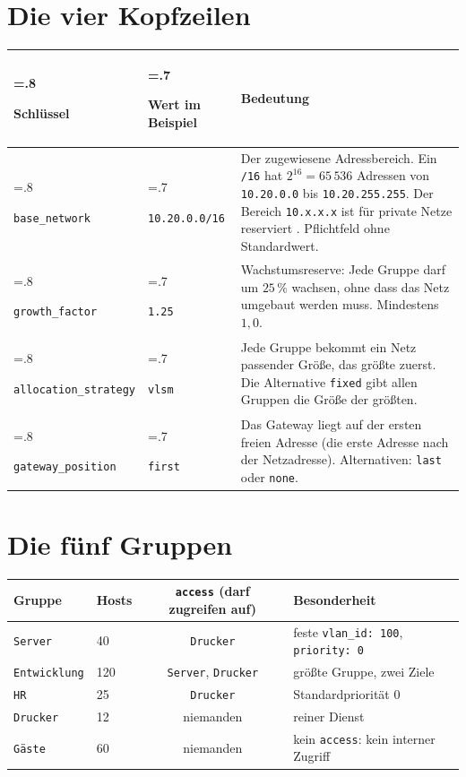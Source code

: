 \documentclass[a4paper,12pt, twoside]{report}
\theoremstyle{definition}
\begin{document}
\section{Die vier Kopfzeilen}

\begin{center}
\small
\begin{tabularx}{\textwidth}{>{\hsize=.8\hsize\raggedright\arraybackslash}X>{\hsize=.7\hsize\raggedright\arraybackslash}X>{\hsize=1.5\hsize\raggedright\arraybackslash}X}
\toprule
Schlüssel & Wert im Beispiel & Bedeutung \\
\midrule
\texttt{base\_network} & \texttt{10.20.0.0/16} & Der zugewiesene Adressbereich. Ein \texttt{/16} hat $2^{16} = 65\,536$ Adressen von \texttt{10.20.0.0} bis \texttt{10.20.255.255}. Der Bereich \texttt{10.x.x.x} ist für private Netze reserviert \cite{rfc1918}. Pflichtfeld ohne Standardwert. \\
\texttt{growth\_factor} & \texttt{1.25} & Wachstumsreserve: Jede Gruppe darf um $25\,\%$ wachsen, ohne dass das Netz umgebaut werden muss. Mindestens $1{,}0$. \\
\texttt{allocation\_strategy} & \texttt{vlsm} & Jede Gruppe bekommt ein Netz passender Größe, das größte zuerst. Die Alternative \texttt{fixed} gibt allen Gruppen die Größe der größten. \\
\texttt{gateway\_position} & \texttt{first} & Das Gateway liegt auf der ersten freien Adresse (die erste Adresse nach der Netzadresse). Alternativen: \texttt{last} oder \texttt{none}. \\
\bottomrule
\end{tabularx}
\end{center}

\section{Die fünf Gruppen}

\begin{center}
\small
\begin{tabular}{llcl}
\toprule
Gruppe & Hosts & \texttt{access} (darf zugreifen auf) & Besonderheit \\
\midrule
\texttt{Server} & 40 & \texttt{Drucker} & feste \texttt{vlan\_id: 100}, \texttt{priority: 0} \\
\texttt{Entwicklung} & 120 & \texttt{Server}, \texttt{Drucker} & größte Gruppe, zwei Ziele \\
\texttt{HR} & 25 & \texttt{Drucker} & Standardpriorität $0$ \\
\texttt{Drucker} & 12 & niemanden & reiner Dienst \\
\texttt{Gäste} & 60 & niemanden & kein \texttt{access}: kein interner Zugriff \\
\bottomrule
\end{tabular}
\end{center}
\end{document}
